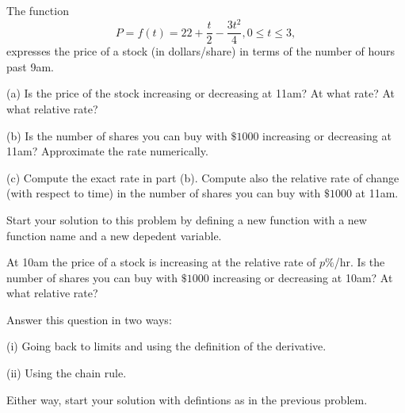 \documentclass{ximera}
\begin{document}
\begin{question}  \label{Ex:pdfsd0tr}
The function 
\[
       P  = f(t) = 22 + \frac{t}{2} - \frac{3t^2}{4} , 0\leq t \leq 3 , 
\]
expresses the price of a stock (in dollars/share) in terms of the number of hours past 9am.

(a) Is the price of the stock increasing or decreasing at 11am? At what rate? At what relative rate?

(b) Is the number of shares you can buy with $\$1000$ increasing or decreasing at 11am? Approximate the rate numerically.

(c) Compute the exact rate in part (b). Compute also the relative rate of change (with respect to time) in the number of shares you can buy with $\$1000$ at 11am.

Start your solution to this problem by defining a new function with a new function name and a new depedent variable.

\end{question}


\begin{question} \label{Ex:sd0fset}
At 10am the price of a stock is increasing at the relative rate of $p\%$/hr. Is the number of shares you can buy with $\$1000$ increasing or decreasing at 10am? At what relative rate?

Answer this question in two ways:

(i) Going back to limits and using the definition of the derivative.

(ii) Using the chain rule.

Either way, start your solution with defintions as in the previous problem.

\end{question}
\end{document}
